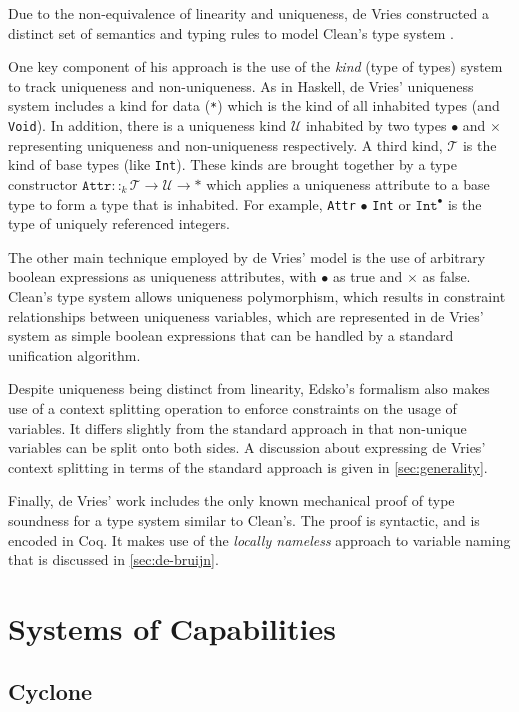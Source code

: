 \documentclass[]{unswthesis}
\let\c\texttt
\let\i\textit
\begin{document}
Due to the non-equivalence of linearity and uniqueness, de Vries constructed a distinct set of semantics and typing rules to model Clean's type system \cite{deVries07}.

One key component of his approach is the use of the \i{kind} (type of types) system to track uniqueness and non-uniqueness. As in Haskell, de Vries' uniqueness system includes a kind for data (\c{*}) which is the kind of all inhabited types (and \c{Void}). In addition, there is a uniqueness kind $\mathcal{U}$ inhabited by two types $\bullet$ and $\times$ representing uniqueness and non-uniqueness respectively. A third kind, $\mathcal{T}$ is the kind of base types (like \c{Int}). These kinds are brought together by a type constructor $\c{Attr} ::_k \mathcal{T} \rightarrow \mathcal{U} \rightarrow *$ which applies a uniqueness attribute to a base type to form a type that is inhabited. For example, \c{Attr} $\bullet$ \c{Int} or $\c{Int}^\bullet$ is the type of uniquely referenced integers.

The other main technique employed by de Vries' model is the use of arbitrary boolean expressions as uniqueness attributes, with $\bullet$ as true and $\times$ as false. Clean's type system allows uniqueness polymorphism, which results in constraint relationships between uniqueness variables, which are represented in de Vries' system as simple boolean expressions that can be handled by a standard unification algorithm.

Despite uniqueness being distinct from linearity, Edsko's formalism also makes use of a context splitting operation to enforce constraints on the usage of variables. It differs slightly from the standard approach in that non-unique variables can be split onto both sides. A discussion about expressing de Vries' context splitting in terms of the standard approach is given in \cref{sec:generality}.

Finally, de Vries' work includes the only known mechanical proof of type soundness for a type system similar to Clean's. The proof is syntactic, and is encoded in Coq. It makes use of the \i{locally nameless} approach to variable naming that is discussed in \cref{sec:de-bruijn}.

\section{Systems of Capabilities}

\subsection{Cyclone}
\end{document}

